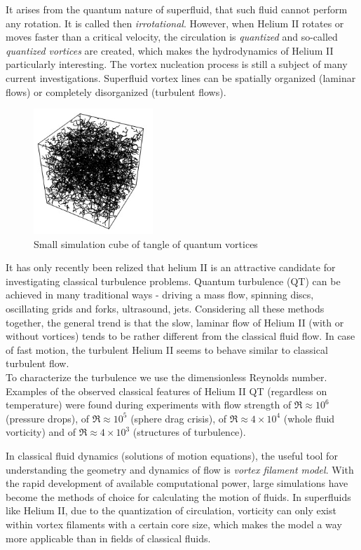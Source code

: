 	It arises from the quantum nature of superfluid, that such fluid cannot perform any rotation. It is called then \textit{irrotational}. However, when Helium II rotates or moves faster than a critical velocity, the circulation is \textit{quantized} and so-called \textit{quantized vortices} are created, which makes the hydrodynamics of Helium II particularly interesting. The vortex nucleation process is still a subject of many current investigations. Superfluid vortex lines can be spatially organized (laminar flows) or completely disorganized (turbulent flows).

	\begin{figure}[h]
		\centering
		\includegraphics[width=0.4\textwidth]{graphics/theory/QT-tangle}
		\caption{Small simulation cube of tangle of quantum vortices}
		\label{QT}
	\end{figure}

	It has only recently been relized that helium II is an attractive candidate for investigating classical turbulence problems. Quantum turbulence (QT) can be achieved in many traditional ways - driving a mass flow, spinning discs, oscillating grids and forks, ultrasound, jets. Considering all these methods together, the general trend is that the slow, laminar flow of Helium II (with or without vortices) tends to be rather different from the classical fluid flow. In case of fast motion, the turbulent Helium II seems to behave similar to classical turbulent flow.\\
	To characterize the turbulence we use the dimensionless Reynolds number. Examples of the observed classical features of Helium II QT (regardless on temperature) were found during experiments with flow strength of $\Re \approx 10^6$ (pressure drops), of $\Re \approx 10^5$ (sphere drag crisis), of $\Re \approx 4 \times 10^4$ (whole fluid vorticity) and of $\Re \approx 4 \times 10^3$ (structures of turbulence).

	In classical fluid dynamics (solutions of motion equations), the useful tool for understanding the geometry and dynamics of flow is \textit{vortex filament model}. With the rapid development of available computational power, large simulations have become the methods of choice for calculating the motion of fluids. In superfluids like Helium II, due to the quantization of circulation, vorticity can only exist within vortex filaments with a certain core size, which makes the model a way more applicable than in fields of classical fluids.



